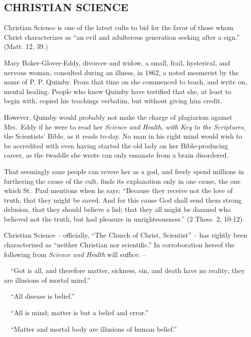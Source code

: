 \documentclass[
]{book}
\begin{document}
\subsection{CHRISTIAN SCIENCE}\label{christian-science}

Christian Science is one of the latest cults to bid for the favor of those whom Christ characterizes as ``an evil and adulterous generation seeking after a sign.'' (Matt. 12, 39.)

Mary Baker-Glover-Eddy, divorcee and widow, a small, frail, hysterical, and nervous woman, consulted during an illness, in 1862, a noted mesmerist by the name of P. P. Quimby. From that time on she commenced to teach, and write on, mental healing. People who knew Quimby have testified that she, at least to begin with, copied his teachings verbatim, but without giving him credit.

However, Quimby would probably not make the charge of plagiarism against Mrs.~Eddy if he were to read her \emph{Science and Health, with Key to the Scriptures}, the Scientists' Bible, as it reads to-day. No man in his right mind would wish to be accredited with even having started the old lady on her Bible-producing career, as the twaddle she wrote can only emanate from a brain disordered.

That seemingly sane people can revere her as a god, and freely spend millions in furthering the cause of the cult, finds its explanation only in one cause, the one which St.~Paul mentions when he says: ``Because they receive not the love of truth, that they might be saved. And for this cause God shall send them strong delusion, that they should believe a liel; that they all might be damned who believed not the truth, but had pleasure in unrighteousness.'' (2 Thess. 2, 10-12).

Christian Science -- officially, ``The Church of Christ, Scientist'' -- has rightly been characterized as ``neither Christian nor scientific.'' In corroboration hereof the following from \emph{Science and Health} will suffice: --

~~``Got is all, and therefore matter, sickness, sin, and death have no reality; they are illusions of mortal mind.''

~~``All disease is belief.''

~~``All is mind; matter is but a belief and error.''

~~``Matter and mortal body are illusions of human belief.''
\end{document}
